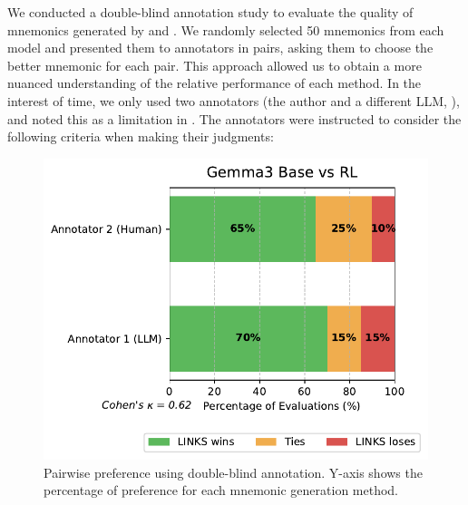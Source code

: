 We conducted a double-blind annotation study to evaluate the quality of mnemonics generated by \studentmodel and \linksys. We randomly selected 50 mnemonics from each model and presented them to annotators in pairs, asking them to choose the better mnemonic for each pair. This approach allowed us to obtain a more nuanced understanding of the relative performance of each method. In the interest of time, we only used two annotators (the author and a different LLM, \judgemodel), and noted this as a limitation in . The annotators were instructed to consider the following criteria when making their judgments:

\begin{figure}[htb]
  \centering
  \includegraphics[width=\linewidth]{figures/model_comparison.pdf}
  \caption{Pairwise preference using double-blind annotation. Y-axis shows the percentage of preference for each mnemonic generation method.}
\end{figure}
